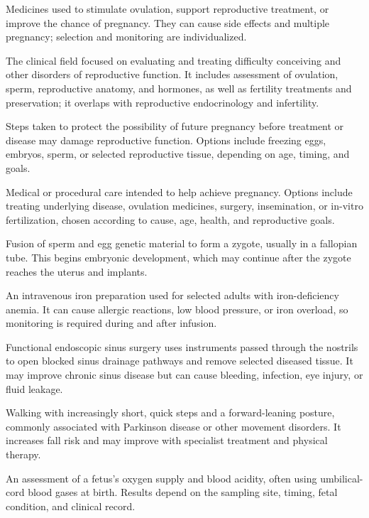  Medicines used to stimulate ovulation, support reproductive treatment, or improve the chance of pregnancy. They can cause side effects and multiple pregnancy; selection and monitoring are individualized.

 The clinical field focused on evaluating and treating difficulty conceiving
and other disorders of reproductive function. It includes assessment of ovulation, sperm,
reproductive anatomy, and hormones, as well as fertility treatments and preservation; it
overlaps with reproductive endocrinology and infertility.

 Steps taken to protect the possibility of future pregnancy before treatment or disease may damage reproductive function. Options include freezing eggs, embryos, sperm, or selected reproductive tissue, depending on age, timing, and goals.

 Medical or procedural care intended to help achieve pregnancy. Options include treating underlying disease, ovulation medicines, surgery, insemination, or in-vitro fertilization, chosen according to cause, age, health, and reproductive goals.

 Fusion of sperm and egg genetic material to form a zygote, usually in a fallopian tube. This begins embryonic development, which may continue after the zygote reaches the uterus and implants.

 An intravenous iron preparation used for selected adults with iron-deficiency anemia. It can cause allergic reactions, low blood pressure, or iron overload, so monitoring is required during and after infusion.

 Functional endoscopic sinus surgery uses instruments passed through the nostrils to open blocked sinus drainage pathways and remove selected diseased tissue. It may improve chronic sinus disease but can cause bleeding, infection, eye injury, or fluid leakage.

 Walking with increasingly short, quick steps and a forward-leaning posture, commonly associated with Parkinson disease or other movement disorders. It increases fall risk and may improve with specialist treatment and physical therapy.

 An assessment of a fetus’s oxygen supply and blood acidity, often using umbilical-cord blood gases at birth. Results depend on the sampling site, timing, fetal condition, and clinical record.


